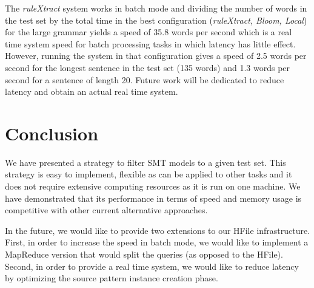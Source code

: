 The \emph{ruleXtract} system works in batch mode and dividing the number of
words in the test set by the total time in the best configuration
(\emph{ruleXtract, Bloom, Local}) for the large grammar yields a speed of 35.8
words per second which is a real time system speed for batch processing tasks in
which latency has little effect. However, running the system in that
configuration gives a speed of 2.5 words per second for the longest sentence in
the test set (135 words) and 1.3 words per second for a sentence of length 20.
Future work will be dedicated to reduce latency and obtain an actual real time
system.

\section{Conclusion}
\label{sec:conclusion}

We have presented a strategy to filter SMT models to a given test set.
This strategy is easy to implement, flexible as can be applied to other tasks
and it does not require extensive computing resources as it is run on one
machine. We have demonstrated that its performance in terms of speed and memory
usage is competitive with other current alternative approaches.

In the future, we would like to provide two extensions to our HFile
infrastructure. First, in order to increase the speed in batch mode, we would
like to implement a MapReduce version that would split the queries (as opposed
to the HFile). Second, in order to provide a real time system, we would like to
reduce latency by optimizing the source pattern instance creation phase.
